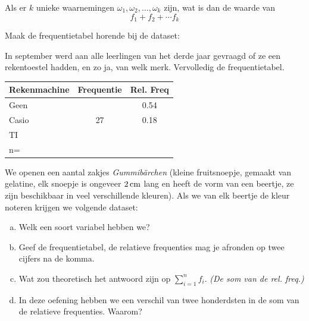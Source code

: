 \documentclass[12pt,twoside,a4paper]{article}
\begin{document}
\begin{oefening}
Als er $k$ unieke waarnemingen $\omega_1, \omega_2, \ldots, \omega_k$ zijn, wat is dan de waarde van
$$f_1 + f_2 + \cdots f_k$$
\end{oefening}

\begin{oefening}
Maak de frequentietabel horende bij de dataset:
\end{oefening}

\begin{oefening}
In september werd aan alle leerlingen van het derde jaar gevraagd of ze een rekentoestel hadden, en zo ja, van welk merk. Vervolledig de frequentietabel.
\begin{center}
\begin{tabular}{l|c|c}
Rekenmachine & Frequentie & Rel. Freq \\\hline
Geen         &            & 0.54      \\\hline
Casio        & 27         & 0.18      \\\hline
TI           &            &           \\\hline
n=           &            &           \\
\end{tabular}
\end{center}
\end{oefening}

\begin{oefening}
 We openen een aantal zakjes {\em Gummibärchen} (kleine fruitsnoepje, gemaakt van gelatine, elk snoepje is ongeveer $2 \cm$ lang en heeft de vorm van een beertje, ze zijn beschikbaar in veel verschillende kleuren). Als we van elk beertje de kleur noteren krijgen we volgende dataset:


\begin{enumerate}[(a)]
\item Welk een soort variabel hebben we?
\item Geef de frequentietabel, de relatieve frequenties mag je afronden op twee cijfers na de komma.
\item Wat zou theoretisch het antwoord zijn op $\sum_{i=1}^n f_i$. {\em (De som van de rel. freq.)}
\item In deze oefening hebben we een verschil van twee honderdsten in de som van de relatieve frequenties. Waarom?
\end{enumerate}
\end{oefening}
\end{document}
